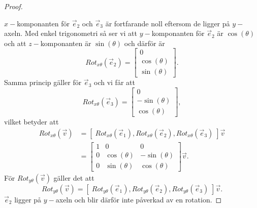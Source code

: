 \documentclass{article}
\theoremstyle{definition}
\begin{document}
\begin{proof}
\begin{center}
  \end{center}
  $x-$komponanten för $\vec{e}_2$ och $\vec{e}_3$ är fortfarande noll eftersom de ligger på $y-$axeln. 
  Med enkel trigonometri så ser vi att $y-$komponanten för $\vec{e}_2$ är $\cos(\theta)$ och att 
  $z-$komponanten är $\sin(\theta)$ och därför är 
  \[Rot_{x\theta} (\vec{e}_2) = 
  \begin{bmatrix}
    0 \\
    \cos(\theta) \\
    \sin(\theta) 
  \end{bmatrix}.
  \] 
  Samma princip gäller för $\vec{e}_3$ och vi får att 
  \[Rot_{x\theta} (\vec{e}_3) = 
  \begin{bmatrix}
    0 \\
    -\sin(\theta) \\
    \cos(\theta)
  \end{bmatrix},
  \]
  vilket betyder att 
  \begin{align*}
    Rot_{x\theta} (\vec{v}) &= [\; Rot_{x\theta} (\vec{e}_1), Rot_{x\theta} (\vec{e}_2), 
    Rot_{x\theta} (\vec{e}_3)\;] \vec{v} \\
    &=
    \begin{bmatrix}
      1 & 0 & 0 \\
      0 & \cos(\theta) & -\sin(\theta) \\
      0 & \sin(\theta) & \cos(\theta)
    \end{bmatrix} \vec{v}.
  \end{align*}
  För 
  $Rot_{y\theta} (\vec{v})$ gäller det att 
  \[Rot_{y\theta} (\vec{v}) = [\; Rot_{y\theta} (\vec{e}_1), Rot_{y\theta} (\vec{e}_2), 
  Rot_{y\theta} (\vec{e}_3)\;] \vec{v}.\]
  $\vec{e}_2$ ligger på $y-$axeln och blir därför inte påverkad av en rotation.

\end{proof}
\end{document}
